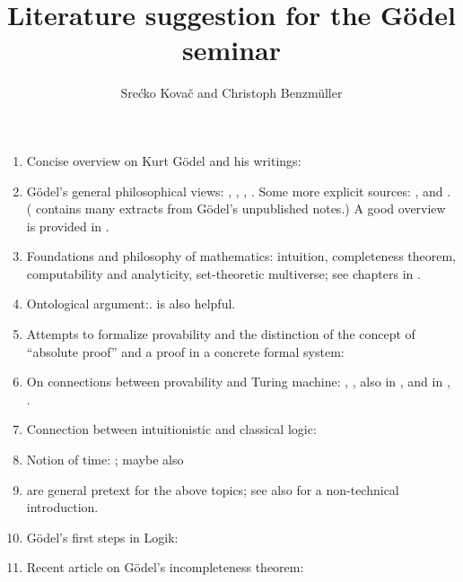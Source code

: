 \documentclass[12pt]{article}
\title{Literature suggestion for the G\" odel seminar}
\author{Sre\'{c}ko Kova\v{c} and Christoph Benzm\"uller}
\date{ }
\begin{document}
\maketitle
\thispagestyle{empty}


\begin{enumerate}
\item Concise overview on Kurt Gödel and his writings:
  \cite{sep-goedel}


\item  G\" odel's general philosophical views: \cite{goed:russell},
  \cite{goed:basic},  \cite{goed:modern},
  \cite{goed:cantor-orig-64}. Some more explicit sources:
  \cite{wang:96}, and \cite{crocco:hal-01459188}.
  (\cite{crocco:KGP-S} contains many extracts from G\" odel's
  unpublished notes.) A good overview is provided in \cite{atten:03}.



\item {Foundations and philosophy of mathematics:} intuition,
  completeness theorem, computability and analyticity, set-theoretic
  multiverse; see chapters in \cite{kennedy14}.

\item Ontological argument:\cite{goed:onto}. \cite{goed:kant} is also
  helpful. 

\item Attempts to formalize provability and the distinction of the concept of ``absolute proof'' and a proof in a concrete formal system: \cite{goed:ext}

\item On connections between provability and Turing machine:
  \cite{goed:bicen}, \cite[postscriptum on
  pp. 369--371]{goed:undec-prop}, also in
  \cite[p. 308--309]{goed:basic}, and in \cite[note on
  p. 195]{goed:undec}, \cite{goed:remarks}.

\item Connection between intuitionistic and classical logic:
  \cite{Godel1933,Godel1969-GDEAIO}

\item Notion of time: \cite{godel9:_einst,goed:basic}; maybe also
  \cite{goldstein06:_incom,Yourgrau1991-YOUTDO-4}


\item \cite{godel30:_volls_axiom_funkt,goed:undec} are general pretext
  for the above topics; see also \cite{nagel01} for a non-technical
  introduction.

\item Gödel's first steps in Logik: \cite{vanPlatoBSL18}

\item Recent article on Gödel's incompleteness theorem: \cite{vanPlatoICM18}

 \end{enumerate}





\end{document}
